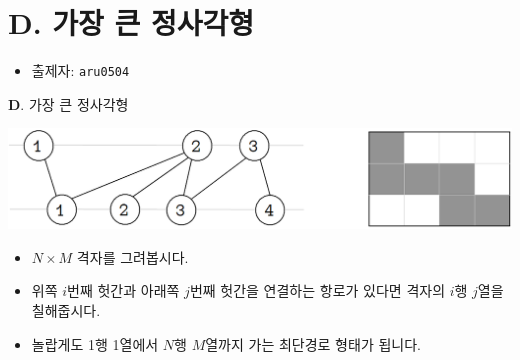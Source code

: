 \section{D. 가장 큰 정사각형}

\begin{frame} %
    \begin{itemize}
        \item 출제자: \texttt{aru0504}
    \end{itemize}
\end{frame}

\begin{frame}{\textbf{D}. 가장 큰 정사각형}
    \begin{center}
        \includegraphics[width=0.8\linewidth]{../images/cow-fly/D-1.png}
    \end{center}
    \begin{itemize}
        \item $N \times M$ 격자를 그려봅시다.
        \item 위쪽 $i$번째 헛간과 아래쪽 $j$번째 헛간을 연결하는 항로가 있다면 격자의 $i$행 $j$열을 칠해줍시다.
        \item 놀랍게도 1행 1열에서 $N$행 $M$열까지 가는 최단경로 형태가 됩니다.
    \end{itemize}
\end{frame}